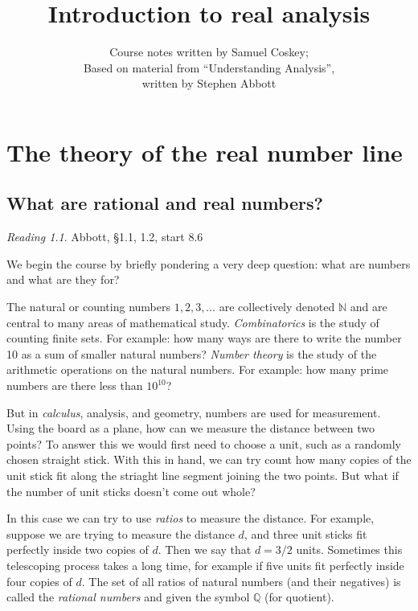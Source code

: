 \documentclass[11pt,oneside]{amsbook}
\title{Introduction to real analysis}
\author{Course notes written by Samuel Coskey;\\Based on material from ``Understanding Analysis'',\\written by Stephen Abbott}
\newcommand{\N}{\mathbb N}
\newcommand{\Q}{\mathbb Q}
\theoremstyle{definition}
\theoremstyle{plain}
\theoremstyle{definition}
\theoremstyle{remark}
\newtheorem*{reading}{Reading}
\numberwithin{equation}{section}
\numberwithin{figure}{section}
\begin{document}
\maketitle

\tableofcontents

\chapter{The theory of the real number line}

\section{What are rational and real numbers?}

\begin{reading}
  Abbott, \S 1.1, 1.2, start 8.6
\end{reading}


We begin the course by briefly pondering a very deep question: what are numbers and what are they for?

The natural or counting numbers $1,2,3,\ldots$ are collectively denoted $\N$ and are central to many areas of mathematical study. \emph{Combinatorics} is the study of counting finite sets. For example: how many ways are there to write the number 10 as a sum of smaller natural numbers? \emph{Number theory} is the study of the arithmetic operations on the natural numbers. For example: how many prime numbers are there less than $10^{10}$?

But in \emph{calculus}, analysis, and geometry, numbers are used for measurement. Using the board as a plane, how can we measure the distance between two points? To answer this we would first need to choose a unit, such as a randomly chosen straight stick. With this in hand, we can try count how many copies of the unit stick fit along the striaght line segment joining the two points. But what if the number of unit sticks doesn't come out whole?

In this case we can try to use \emph{ratios} to measure the distance. For example, suppose we are trying to measure the distance $d$, and three unit sticks fit perfectly inside two copies of $d$. Then we say that $d=3/2$ units. Sometimes this telescoping process takes a long time, for example if five units fit perfectly inside four copies of $d$. The set of all ratios of natural numbers (and their negatives) is called the \emph{rational numbers} and given the symbol $\Q$ (for quotient).
\end{document}
